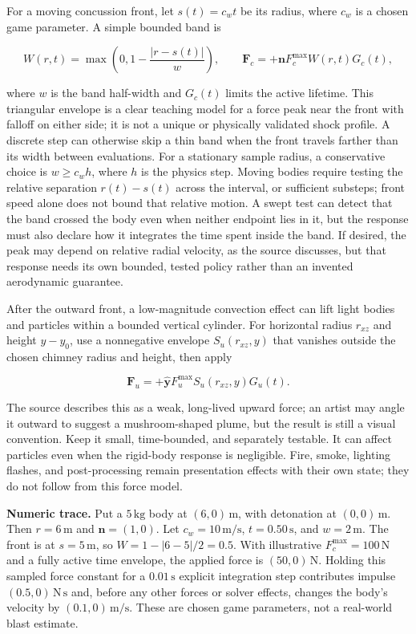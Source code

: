 For a moving concussion front, let \(s(t)=c_wt\) be its radius, where \(c_w\) is a chosen game parameter. A simple bounded band is

\[
W(r,t)=\max\left(0,1-\frac{|r-s(t)|}{w}\right),\qquad
\mathbf F_c=+\mathbf n F_c^{\max}W(r,t)G_c(t),
\]

where \(w\) is the band half-width and \(G_c(t)\) limits the active lifetime. This triangular envelope is a clear teaching model for a force peak near the front with falloff on either side; it is not a unique or physically validated shock profile. A discrete step can otherwise skip a thin band when the front travels farther than its width between evaluations. For a stationary sample radius, a conservative choice is \(w\geq c_w h\), where \(h\) is the physics step. Moving bodies require testing the relative separation \(r(t)-s(t)\) across the interval, or sufficient substeps; front speed alone does not bound that relative motion. A swept test can detect that the band crossed the body even when neither endpoint lies in it, but the response must also declare how it integrates the time spent inside the band. If desired, the peak may depend on relative radial velocity, as the source discusses, but that response needs its own bounded, tested policy rather than an invented aerodynamic guarantee.

After the outward front, a low-magnitude convection effect can lift light bodies and particles within a bounded vertical cylinder. For horizontal radius \(r_{xz}\) and height \(y-y_0\), use a nonnegative envelope \(S_u(r_{xz},y)\) that vanishes outside the chosen chimney radius and height, then apply

\[
\mathbf F_u=+\hat{\mathbf y}F_u^{\max}S_u(r_{xz},y)G_u(t).
\]

The source describes this as a weak, long-lived upward force; an artist may angle it outward to suggest a mushroom-shaped plume, but the result is still a visual convention. Keep it small, time-bounded, and separately testable. It can affect particles even when the rigid-body response is negligible. Fire, smoke, lighting flashes, and post-processing remain presentation effects with their own state; they do not follow from this force model.

\textbf{Numeric trace.} Put a \(5\,\mathrm{kg}\) body at \((6,0)\,\mathrm m\), with detonation at \((0,0)\,\mathrm m\). Then \(r=6\,\mathrm m\) and \(\mathbf n=(1,0)\). Let \(c_w=10\,\mathrm{m/s}\), \(t=0.50\,\mathrm s\), and \(w=2\,\mathrm m\). The front is at \(s=5\,\mathrm m\), so \(W=1-|6-5|/2=0.5\). With illustrative \(F_c^{\max}=100\,\mathrm N\) and a fully active time envelope, the applied force is \((50,0)\,\mathrm N\). Holding this sampled force constant for a \(0.01\,\mathrm s\) explicit integration step contributes impulse \((0.5,0)\,\mathrm{N\,s}\) and, before any other forces or solver effects, changes the body's velocity by \((0.1,0)\,\mathrm{m/s}\). These are chosen game parameters, not a real-world blast estimate.

